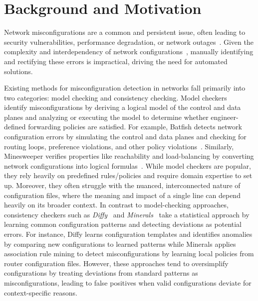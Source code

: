 \section{Background and Motivation}
\label{sec_background}
Network misconfigurations are a common and persistent issue, often leading to security vulnerabilities, performance degradation, or network outages~\cite{zheng2012atpg, feamster2005detecting}. Given the complexity and interdependency of network configurations~\cite{le2007rr, benson2009complexitymetrics}, manually identifying and rectifying these errors is impractical, driving the need for automated solutions.

Existing methods for misconfiguration detection in networks fall primarily into two categories: model checking and consistency checking. Model checkers~\cite{fogel2015general, beckett2017general, abhashkumar2020tiramisu, prabhu2020plankton, zhang2022sre, steffen2020netdice, ye2020hoyan, ritchey2000using,al2011configchecker, jeffrey2009model} identify misconfigurations by deriving a logical model of the control and data planes and analyzing or executing the model to determine whether engineer-defined forwarding policies are satisfied.
For example, Batfish detects network configuration errors by simulating the control and data planes and checking for routing loops, preference violations, and other policy violations~\cite{fogel2015general}. Similarly, Minesweeper verifies properties like reachability and load-balancing by converting network configurations into logical formulas~\cite{beckett2017general}. While model checkers are popular, they rely heavily on predefined rules/policies and require domain expertise to set up. Moreover, they often struggle with the nuanced, interconnected nature of configuration files, where the meaning and impact of a single line can depend heavily on its broader context.
In contrast to model-checking approaches, consistency checkers such as \textit{Diffy}~\cite{kakarla2024diffy} and \textit{Minerals}~\cite{le2006minerals} take a statistical approach by learning common configuration patterns and detecting deviations as potential errors.
For instance, Diffy learns configuration templates and identifies anomalies by comparing new configurations to learned patterns while Minerals applies association rule mining to detect misconfigurations by learning local policies from router configuration files. However, these approaches tend to oversimplify configurations by treating deviations from standard patterns as misconfigurations, leading to false positives when valid configurations deviate for context-specific reasons.


